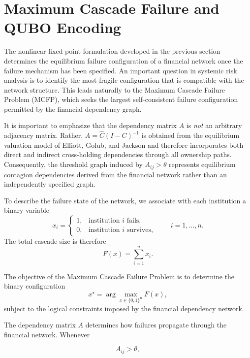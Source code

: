 \documentclass[aps,reprint,superscriptaddress,pra]{revtex4-2}
\begin{document}
\section{Maximum Cascade Failure and QUBO Encoding}
\label{sec:mcfp-ising}

The nonlinear fixed-point formulation developed in the previous section determines the equilibrium failure configuration of a financial network once the failure mechanism has been specified. An important question in systemic risk analysis is to identify the most fragile configuration that is compatible with the network structure. This leads naturally to the Maximum Cascade Failure Problem (MCFP), which seeks the largest self-consistent failure configuration permitted by the financial dependency graph.

It is important to emphasize that the dependency matrix $A$ is \emph{not} an arbitrary adjacency matrix. Rather, $A=\hat C(I-C)^{-1}$ is obtained from the equilibrium valuation model of Elliott, Golub, and Jackson \cite{elliott2014financial} and therefore incorporates both direct and indirect cross-holding dependencies through all ownership paths. Consequently, the threshold graph induced by $A_{ij}>\theta$ represents equilibrium contagion dependencies derived from the financial network rather than an independently specified graph.

To describe the failure state of the network, we associate with each institution a binary variable
\begin{equation}
x_i=
\begin{cases}
1,&\text{institution $i$ fails},\\
0,&\text{institution $i$ survives},
\end{cases}
\qquad
i=1,\ldots,n.
\end{equation}
The total cascade size is therefore
\begin{equation}
F(x)=\sum_{i=1}^{n}x_i.
\end{equation}

The objective of the Maximum Cascade Failure Problem is to determine the binary configuration
\begin{equation}
x^\star
=
\arg\max_{x\in\{0,1\}^n}
F(x),
\label{eq:MCFP}
\end{equation}
subject to the logical constraints imposed by the financial dependency network.

The dependency matrix $A$ determines how failures propagate through the financial network. Whenever

\begin{equation}
A_{ij}>\theta,
\end{equation}
\end{document}
